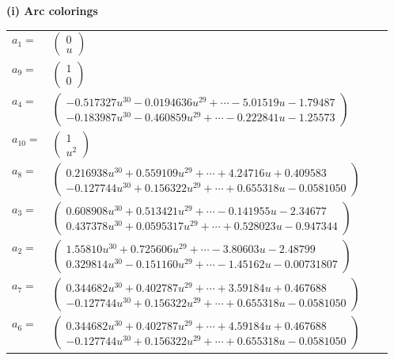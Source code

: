 \documentclass[1p]{elsarticle_modified}
\theoremstyle{definition}
\begin{document}
\flushleft \textbf{(i) Arc colorings}\\
\begin{tabular}{m{7pt} m{180pt} m{7pt} m{180pt} }
\flushright $a_{1}=$&$\begin{pmatrix}0\\u\end{pmatrix}$ \\
\flushright $a_{9}=$&$\begin{pmatrix}1\\0\end{pmatrix}$ \\
\flushright $a_{4}=$&$\begin{pmatrix}-0.517327 u^{30}-0.0194636 u^{29}+\cdots-5.01519 u-1.79487\\-0.183987 u^{30}-0.460859 u^{29}+\cdots-0.222841 u-1.25573\end{pmatrix}$ \\
\flushright $a_{10}=$&$\begin{pmatrix}1\\u^2\end{pmatrix}$ \\
\flushright $a_{8}=$&$\begin{pmatrix}0.216938 u^{30}+0.559109 u^{29}+\cdots+4.24716 u+0.409583\\-0.127744 u^{30}+0.156322 u^{29}+\cdots+0.655318 u-0.0581050\end{pmatrix}$ \\
\flushright $a_{3}=$&$\begin{pmatrix}0.608908 u^{30}+0.513421 u^{29}+\cdots-0.141955 u-2.34677\\0.437378 u^{30}+0.0595317 u^{29}+\cdots+0.528023 u-0.947344\end{pmatrix}$ \\
\flushright $a_{2}=$&$\begin{pmatrix}1.55810 u^{30}+0.725606 u^{29}+\cdots-3.80603 u-2.48799\\0.329814 u^{30}-0.151160 u^{29}+\cdots-1.45162 u-0.00731807\end{pmatrix}$ \\
\flushright $a_{7}=$&$\begin{pmatrix}0.344682 u^{30}+0.402787 u^{29}+\cdots+3.59184 u+0.467688\\-0.127744 u^{30}+0.156322 u^{29}+\cdots+0.655318 u-0.0581050\end{pmatrix}$ \\
\flushright $a_{6}=$&$\begin{pmatrix}0.344682 u^{30}+0.402787 u^{29}+\cdots+4.59184 u+0.467688\\-0.127744 u^{30}+0.156322 u^{29}+\cdots+0.655318 u-0.0581050\end{pmatrix}$ \\

\end{tabular}
\end{document}

